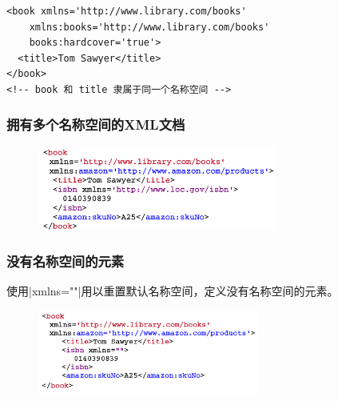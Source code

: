\begin{lstlisting}
<book xmlns='http://www.library.com/books'
	xmlns:books='http://www.library.com/books'
	books:hardcover='true'>
  <title>Tom Sawyer</title>
</book>
<!-- book 和 title 隶属于同一个名称空间 -->
\end{lstlisting}

\subsubsection{拥有多个名称空间的XML文档}
\begin{figure}[H]
    \vspace{-0.5em}
	\centering
	\includegraphics[width=0.7\textwidth]{images/拥有多个名称空间的XML文档}
    \vspace{-1em}
\end{figure}

\subsubsection{没有名称空间的元素}
使用\sverb|xmlns=""|\;用以重置默认名称空间，定义没有名称空间的元素。
\begin{figure}[H]
    \vspace{-0.5em}
	\centering
	\includegraphics[width=0.65\textwidth]{images/没有名称空间的元素}
    \vspace{-1em}
\end{figure}


